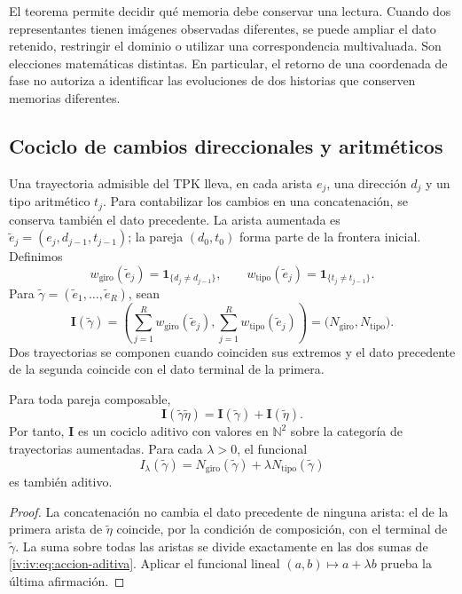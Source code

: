 El teorema permite decidir qué memoria debe conservar una
lectura. Cuando dos representantes tienen imágenes observadas
diferentes, se puede ampliar el dato retenido, restringir
el dominio o utilizar una correspondencia multivaluada.
Son elecciones matemáticas distintas. En particular, el
retorno de una coordenada de fase no autoriza a identificar
las evoluciones de dos historias que conserven memorias
diferentes.

\subsection{Cociclo de cambios direccionales y aritméticos}

Una trayectoria admisible del TPK lleva, en cada arista
\(e_j\), una dirección \(d_j\) y un tipo aritmético
\(t_j\). Para contabilizar los cambios en una concatenación,
se conserva también el dato precedente. La arista aumentada es
\(\widetilde e_j=(e_j,d_{j-1},t_{j-1})\); la pareja
\((d_0,t_0)\) forma parte de la frontera inicial. Definimos
\[
 w_{\mathrm{giro}}(\widetilde e_j)
       =\mathbf1_{\{d_j\ne d_{j-1}\}},\qquad
 w_{\mathrm{tipo}}(\widetilde e_j)
       =\mathbf1_{\{t_j\ne t_{j-1}\}}.
\]
Para \(\widetilde\gamma=(\widetilde e_1,\ldots,
\widetilde e_R)\), sean
\begin{equation}
 \mathbf I(\widetilde\gamma)=
 \left(\sum_{j=1}^R w_{\mathrm{giro}}(\widetilde e_j),
       \sum_{j=1}^R w_{\mathrm{tipo}}(\widetilde e_j)\right)
 =\bigl(N_{\mathrm{giro}},N_{\mathrm{tipo}}\bigr).
 \label{iv:iv:eq:cociclo-accion}
\end{equation}
Dos trayectorias se componen cuando coinciden sus extremos
y el dato precedente de la segunda coincide con el dato
terminal de la primera.

\begin{proposition}
\label{iv:iv:prop:accion-aditiva}
Para toda pareja composable,
\begin{equation}
 \mathbf I(\widetilde\gamma\widetilde\eta)
 =\mathbf I(\widetilde\gamma)+\mathbf I(\widetilde\eta).
 \label{iv:iv:eq:accion-aditiva}
\end{equation}
Por tanto, \(\mathbf I\) es un cociclo aditivo con valores
en \(\mathbb N^2\) sobre la categoría de trayectorias
aumentadas. Para cada \(\lambda>0\), el funcional
\[
 I_\lambda(\widetilde\gamma)
 =N_{\mathrm{giro}}(\widetilde\gamma)
      +\lambda N_{\mathrm{tipo}}(\widetilde\gamma)
\]
es también aditivo.
\end{proposition}
\begin{proof}
La concatenación no cambia el dato precedente de ninguna
arista: el de la primera arista de \(\widetilde\eta\)
coincide, por la condición de composición, con el terminal
de \(\widetilde\gamma\). La suma sobre todas las aristas
se divide exactamente en las dos sumas de
\eqref{iv:iv:eq:accion-aditiva}. Aplicar el funcional lineal
\((a,b)\mapsto a+\lambda b\) prueba la última afirmación.
\end{proof}

